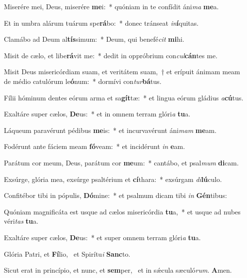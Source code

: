 \item Miserére mei, Deus, miserére \textbf{me}i:~* quóniam in te confídit áni\textit{ma} \textbf{me}a.
\item Et in umbra alárum tuárum spe\textbf{rá}bo:~* donec tránseat \textit{in}\textbf{í}quitas.
\item Clamábo ad Deum al\textbf{tís}si\-mum:~* Deum, qui benefé\textit{cit} \textbf{mi}hi.
\item Misit de cælo, et libe\textbf{rá}vit me:~* dedit in oppróbrium con\textit{cul}\textbf{cán}tes me.
\item Misit Deus misericórdiam suam, et veritátem suam,~† et erípuit ánimam meam de médio catulórum le\textbf{ó}num:~* dormívi con\textit{tur}\textbf{bá}tus.
\item Fílii hóminum dentes eórum arma et sa\textbf{gít}tæ:~* et lingua eórum gládius \textit{a}\textbf{cú}tus.
\item Exaltáre super cælos, \textbf{De}us:~* et in omnem terram glóri\textit{a} \textbf{tu}a.
\item Láqueum paravérunt pédibus \textbf{me}is:~* et incurvavérunt áni\textit{mam} \textbf{me}am.
\item Fodérunt ante fáciem meam \textbf{fó}veam:~* et incidérunt \textit{in} \textbf{e}am.
\item Parátum cor meum, Deus, parátum cor \textbf{me}um:~* cantábo, et psal\textit{mum} \textbf{di}cam.
\item Exsúrge, glória mea, exsúrge psaltérium et \textbf{cí}thara:~* exsúrgam \textit{di}\textbf{lú}culo.
\item Confitébor tibi in pópulis, \textbf{Dó}mine:~* et psalmum dicam tibi \textit{in} \textbf{Gén}tibus:
\item Quóniam magnificáta est usque ad cælos misericórdia \textbf{tu}a,~* et usque ad nubes véri\textit{tas} \textbf{tu}a.
\item Exaltáre super cælos, \textbf{De}us:~* et super omnem terram glóri\textit{a} \textbf{tu}a.
\item Glória Patri, et \textbf{Fí}lio,~\psstar{} et Spirítu\textit{i} \textbf{Sanc}to.
\item Sicut erat in princípio, et nunc, et \textbf{sem}per,~\psstar{} et in sǽcula sæculó\textit{rum}. \textbf{A}men.